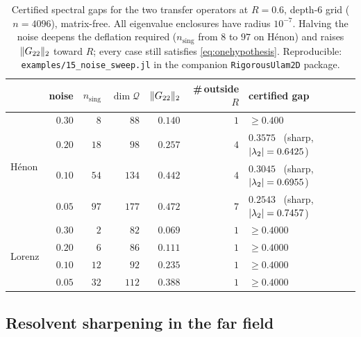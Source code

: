 \documentclass[11pt]{article}
\DeclarePairedDelimiter{\norm}{\lVert}{\rVert}
\DeclarePairedDelimiter{\abs}{\lvert}{\rvert}
\begin{document}
\begin{table}[t]\centering\small
\begin{tabular}{@{}lrrrrrl@{}}
\toprule
& noise & $n_{\mathrm{sing}}$ & $\dim\mathcal Q$ & $\norm{G_{22}}_2$ & \#\,outside $R$ & certified gap \\
\midrule
\multirow{4}{*}{H\'enon}
 & $0.30$ & $8$  & $88$  & $0.140$ & $1$ & $\ge0.400$ \\
 & $0.20$ & $18$ & $98$  & $0.257$ & $4$ & $\mathbf{0.3575}$ \ (sharp, $\abs{\lambda_2}=0.6425$) \\
 & $0.10$ & $54$ & $134$ & $0.442$ & $4$ & $\mathbf{0.3045}$ \ (sharp, $\abs{\lambda_2}=0.6955$) \\
 & $0.05$ & $97$ & $177$ & $0.472$ & $7$ & $\mathbf{0.2543}$ \ (sharp, $\abs{\lambda_2}=0.7457$) \\
\midrule
\multirow{4}{*}{Lorenz}
 & $0.30$ & $2$  & $82$  & $0.069$ & $1$ & $\ge0.4000$ \\
 & $0.20$ & $6$  & $86$  & $0.111$ & $1$ & $\ge0.4000$ \\
 & $0.10$ & $12$ & $92$  & $0.235$ & $1$ & $\ge0.4000$ \\
 & $0.05$ & $32$ & $112$ & $0.388$ & $1$ & $\ge0.4000$ \\
\bottomrule
\end{tabular}
\caption{Certified spectral gaps for the two transfer operators at $R=0.6$, depth-$6$ grid
($n=4096$), matrix-free. All eigenvalue enclosures have radius $10^{-7}$. Halving the noise deepens
the deflation required ($n_{\mathrm{sing}}$ from $8$ to $97$ on H\'enon) and raises $\norm{G_{22}}_2$
toward $R$; every case still satisfies \eqref{eq:onehypothesis}. Reproducible:
\texttt{examples/15\_noise\_sweep.jl} in the companion \texttt{RigorousUlam2D} package.}
\label{tab:gaps}
\end{table}

\subsection{Resolvent sharpening in the far field}\label{sec:farfielddemo}
\end{document}
